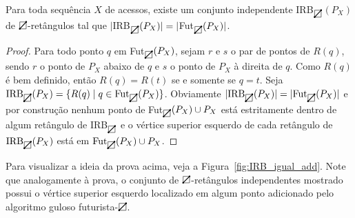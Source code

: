 \begin{lemma} \label{lema_6.1}
    Para toda sequência $X$ de acessos, existe um conjunto independente IRB$_{\rectpos}$$(P_X)$ de $\rectpos$-retângulos tal que $|$IRB$_{\rectpos}(P_X)| = |$Fut$_{\rectpos}(P_X)|$.
\end{lemma}

\begin{proof}
    Para todo ponto $q$ em Fut$_{\rectpos}(P_X)$, sejam $r$ e $s$ o par de pontos de $R(q)$, sendo $r$ o ponto de $P_X$ abaixo de $q$ e $s$ o ponto de $P_X$ à direita de $q$. Como $R(q)$ é bem definido, então $R(q) = R(t)$ se e somente se $q = t$. Seja \( \text{IRB}_{\rectpos}(P_X) = \{ R(q) \mid q \in \text{Fut}_{\rectpos}(P_X) \} \). Obviamente $|\text{IRB}_{\rectpos}(P_X)| = |\text{Fut}_{\rectpos}(P_X)|$ e por construção nenhum ponto de Fut$_{\rectpos}(P_X) \cup P_X$ está estritamente dentro de algum retângulo de IRB$_{\rectpos}$ e o vértice superior esquerdo de cada retângulo de $\text{IRB}_{\rectpos}(P_X)$ está em $\text{Fut}_{\rectpos}(P_X) \cup P_X$.
\end{proof}

Para visualizar a ideia da prova acima, veja a Figura~\ref{fig:IRB_igual_add}. Note que analogamente à prova, o conjunto de $\rectpos$-retângulos independentes mostrado possui o vértice superior esquerdo localizado em algum ponto adicionado pelo algoritmo guloso futurista-$\rectpos$. 

